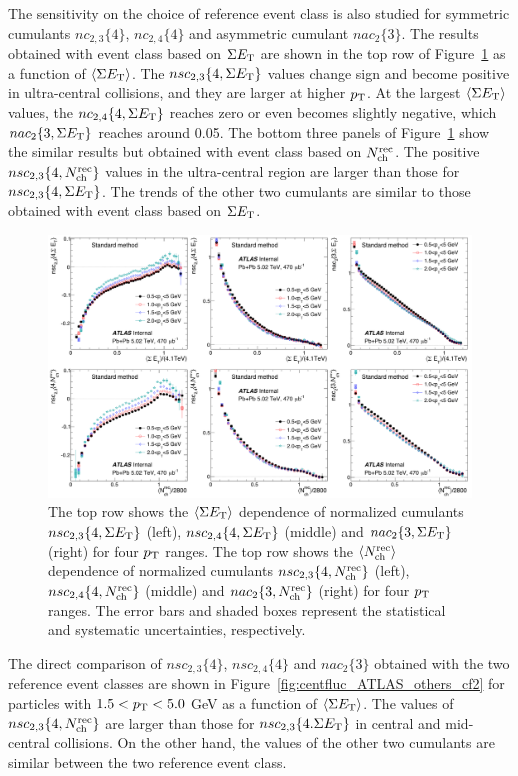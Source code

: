 The sensitivity on the choice of reference event class is also studied for symmetric cumulants $nc_{2,3}\{4\}$, $nc_{2,4}\{4\}$ and asymmetric cumulant $nac_2\{3\}$. The results obtained with event class based on $\Sigma E_\text{T}$ are shown in the top row of Figure~\ref{fig:centfluc_ATLAS_others_cf1} as a function of $\left\langle \Sigma E_\text{T}\right\rangle$. The $nsc_{2,3}\{4, \Sigma E_\text{T}\}$ values change sign and become positive in ultra-central collisions, and they are larger at higher $p_\text{T}$. At the largest $\left\langle \Sigma E_\text{T}\right\rangle$ values, the $nc_{2,4}\{4, \Sigma E_\text{T}\}$ reaches zero or even becomes slightly negative, which $nac_2\{3, \Sigma E_\text{T}\}$ reaches around 0.05. The bottom three panels of Figure~\ref{fig:centfluc_ATLAS_others_cf1} show the similar results but obtained with event class based on $N_\text{ch}^\text{rec}$. The positive $nsc_{2,3}\{4, N_\text{ch}^\text{rec}\}$ values in the ultra-central region are larger than those for $nsc_{2,3}\{4, \Sigma E_\text{T}\}$. The trends of the other two cumulants are similar to those obtained with event class based on $\Sigma E_\text{T}$.

\begin{figure}[H]
\centering
\includegraphics[width=.95\linewidth]{figs/chapter_centfluc/ATLAS_others_cf1.png}
\caption{The top row shows the $\left\langle \Sigma E_\text{T}\right\rangle$ dependence of normalized cumulants $nsc_{2,3}\{4, \Sigma E_\text{T}\}$ (left), $nsc_{2,4}\{4, \Sigma E_\text{T}\}$ (middle) and $nac_2\{3, \Sigma E_\text{T}\}$ (right) for four $p_\text{T}$ ranges. The top row shows the $\left\langle N_\text{ch}^\text{rec}\right\rangle$ dependence of normalized cumulants $nsc_{2,3}\{4, N_\text{ch}^\text{rec}\}$ (left), $nsc_{2,4}\{4, N_\text{ch}^\text{rec}\}$ (middle) and $nac_2\{3, N_\text{ch}^\text{rec}\}$ (right) for four $p_\text{T}$ ranges. The error bars and shaded boxes represent the statistical and systematic uncertainties, respectively.}
\label{fig:centfluc_ATLAS_others_cf1}
\end{figure}

The direct comparison of $nsc_{2,3}\{4\}$, $nsc_{2,4}\{4\}$ and $nac_2\{3\}$ obtained with the two reference event classes are shown in Figure~\ref{fig:centfluc_ATLAS_others_cf2} for particles with $1.5<p_\text{T}<5.0$ GeV as a function of $\left\langle \Sigma E_\text{T}\right\rangle$. The values of $nsc_{2,3}\{4, N_\text{ch}^\text{rec}\}$ are larger than those for $nsc_{2,3}\{4. \Sigma E_\text{T}\}$ in central and mid-central collisions. On the other hand, the values of the other two cumulants are similar between the two reference event class.

